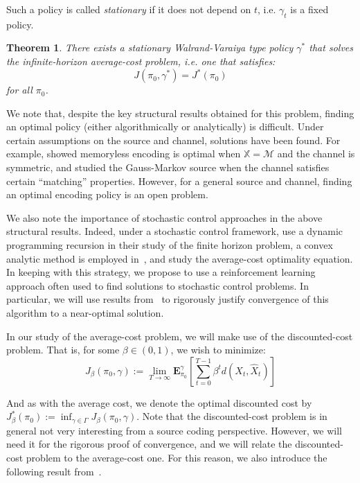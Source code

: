 \documentclass[conference, draftcls, onecolumn]{IEEEtran}
\newtheorem{theorem}{Theorem}
\begin{document}
Such a policy is called \emph{stationary} if it does not depend on \(t\), i.e. \(\gamma_t\) is a fixed policy.

\begin{theorem}\label{theorem:Wood}\cite[Theorem 3]{Wood}
    There exists a stationary Walrand-Varaiya type policy \(\gamma^*\) that solves the infinite-horizon average-cost problem, i.e. one that satisfies:
    \[J(\pi_0,\gamma^*) = J^*(\pi_0)\]
    for all \(\pi_0\).
\end{theorem}

We note that, despite the key structural results obtained for this problem, finding an optimal policy (either algorithmically or analytically) is difficult. Under certain assumptions on the source and channel, solutions have been found. For example, \cite{Walrand} showed memoryless encoding is optimal when \(\mathbb{X} = \mathcal{M}\) and the channel is symmetric, and \cite{Tatikonda2004} studied the Gauss-Markov source when the channel satisfies certain ``matching'' properties. However, for a general source and channel, finding an optimal encoding policy is an open problem.

We also note the importance of stochastic control approaches in the above structural results. Indeed, under a stochastic control framework, \cite{Witsenhausen, Walrand} use a dynamic programming recursion in their study of the finite horizon problem, a convex analytic method is employed in~\cite{Linder}, and \cite{Wood, Tatikonda2009} study the average-cost optimality equation. In keeping with this strategy, we propose to use a reinforcement learning approach often used to find solutions to stochastic control problems. In particular, we will use results from~\cite{Kara} to rigorously justify convergence of this algorithm to a near-optimal solution.

In our study of the average-cost problem, we will make use of the discounted-cost problem. That is, for some \( \beta \in (0,1) \), we wish to minimize:
\[ J_{\beta}(\pi_0, \gamma) := \lim_{T\to\infty}\mathbf{E}_{\pi_0}^{\gamma}\left[\sum_{t=0}^{T-1}\beta^t d(X_t,\hat{X}_t)\right]\label{eq:discounted_cost} \]

And as with the average cost, we denote the optimal discounted cost by \(J_\beta^*(\pi_0) := \inf_{\gamma \in \Gamma}J_\beta(\pi_0,\gamma)\). Note that the discounted-cost problem is in general not very interesting from a source coding perspective. However, we will need it for the rigorous proof of convergence, and we will relate the discounted-cost problem to the average-cost one. For this reason, we also introduce the following result from~\cite{Wood}.
\end{document}
